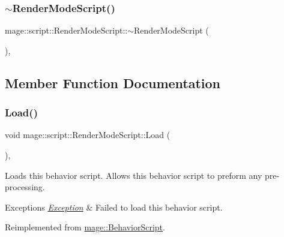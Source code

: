 \subsubsection{\texorpdfstring{$\sim$\+Render\+Mode\+Script()}{~RenderModeScript()}}
{\footnotesize\ttfamily mage\+::script\+::\+Render\+Mode\+Script\+::$\sim$\+Render\+Mode\+Script (\begin{DoxyParamCaption}{ }\end{DoxyParamCaption})\hspace{0.3cm}{\ttfamily [virtual]}, {\ttfamily [default]}}



\subsection{Member Function Documentation}
\hypertarget{classmage_1_1script_1_1_render_mode_script_ab116aa499231f34dbc61b69e121e2e49}{}\label{classmage_1_1script_1_1_render_mode_script_ab116aa499231f34dbc61b69e121e2e49} 
\subsubsection{\texorpdfstring{Load()}{Load()}}
{\footnotesize\ttfamily void mage\+::script\+::\+Render\+Mode\+Script\+::\+Load (\begin{DoxyParamCaption}{ }\end{DoxyParamCaption})\hspace{0.3cm}{\ttfamily [override]}, {\ttfamily [virtual]}}

Loads this behavior script. Allows this behavior script to preform any pre-\/processing.


\begin{DoxyExceptions}{Exceptions}
{\em \hyperlink{classmage_1_1_exception}{Exception}} & Failed to load this behavior script. \\
\hline
\end{DoxyExceptions}


Reimplemented from \hyperlink{classmage_1_1_behavior_script_a06521eef472f2d878a9f652b95b723a8}{mage\+::\+Behavior\+Script}.

\hypertarget{classmage_1_1script_1_1_render_mode_script_af735235c25858295c4e5e23586b19f20}{}\label{classmage_1_1script_1_1_render_mode_script_af735235c25858295c4e5e23586b19f20} 
